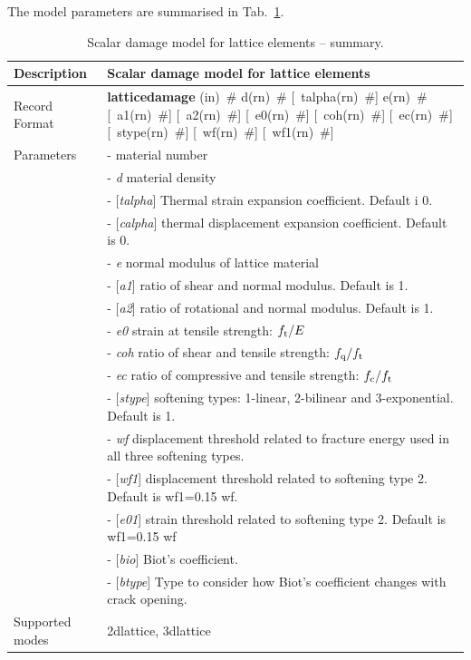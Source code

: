 \documentclass[a4paper]{article}
\newcommand{\descitem}[1]{{\noindent \bf #1}}
\newcommand{\elemparam}[2]{{{#1\tiny (#2)}~\#}}
\newcommand{\optelemparam}[2]{[{~\elemparam{#1}{#2}}]}
\newcommand{\param}[1]{{\it #1}}
\newcommand{\optparam}[1]{[{\it #1}]}
\newenvironment{mmt}{\begin{tabular}{|l|p{9cm}|}}{\end{tabular}\\}
\newenvironment{mmt}{\begin{tabular}{|l|l|}}{\end{tabular}\\}
\begin{document}
The model parameters are summarised in Tab.~\ref{latticedamage_table}.
\begin{table}[!htb]
\begin{mmt}
\hline
Description & Scalar damage model for lattice elements \\
\hline
Record Format & \descitem{latticedamage} \elemparam{}{in} 
\elemparam{d}{rn} \optelemparam{talpha}{rn} \elemparam{e}{rn} \optelemparam{a1}{rn} \optelemparam{a2}{rn} \optelemparam{e0}{rn}  \optelemparam{coh}{rn} \optelemparam{ec}{rn} \optelemparam{stype}{rn} \optelemparam{wf}{rn} \optelemparam{wf1}{rn} \\
Parameters &- \param{} material number\\
&- \param{d} material density\\
&- \optparam{talpha} Thermal strain expansion coefficient. Default i 0.\\
&- \optparam{calpha} thermal displacement expansion coefficient. Default is 0.\\
&- \param{e} normal modulus of lattice material\\
&- \optparam{a1} ratio of shear and normal modulus. Default is 1.\\
&- \optparam{a2} ratio of rotational and normal modulus. Default is 1.\\
&- \param{e0} strain at tensile strength: $f_{\rm t}/E$\\
&- \param{coh} ratio of shear and tensile strength: $f_{\rm q}/f_{\rm t}$\\
&- \param{ec} ratio of compressive and tensile strength: $f_{\rm c}/f_{\rm t}$\\
&- \optparam{stype} softening types: 1-linear, 2-bilinear and 3-exponential. Default is 1.\\
&- \param{wf} displacement threshold related to fracture energy used in all three softening types.\\
&- \optparam{wf1} displacement threshold related to softening type 2. Default is wf1=0.15 wf.\\
&- \optparam{e01} strain threshold related to softening type 2. Default is wf1=0.15 wf\\
&- \optparam{bio} Biot's coefficient.\\
&- \optparam{btype} Type to consider how Biot's coefficient changes with crack opening.\\

Supported modes& 2dlattice, 3dlattice\\
\hline
\end{mmt}
\caption{Scalar damage model for lattice elements -- summary.}
\label{latticedamage_table}
\end{table}
\end{document}
